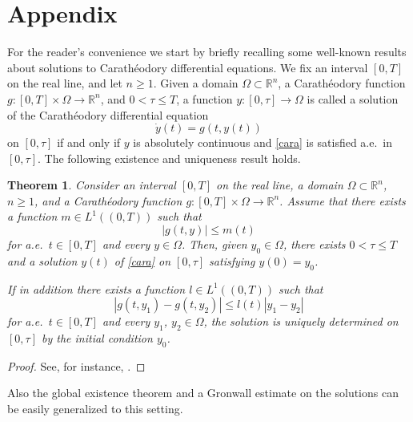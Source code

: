 \documentclass[11pt]{article}
\theoremstyle{plain}
\newtheorem{theorem}{Theorem}[section]
\theoremstyle{definition}
\theoremstyle{remark}
\numberwithin{equation}{section}
\newcommand{\R}{{\mathbb R}}
\newcommand{\Om}{\Omega}
\begin{document}
\section{Appendix}
For the reader's convenience we start by briefly recalling some well-known results about solutions to Carath{\'e}odory differential equations. We fix an interval $[0,T]$ on the real line, and let $n\ge 1$.
Given a domain $\Om \subset \R^n$, a Carath{\'e}odory function $g\colon[0,T]\times \Om \to \R^n$, and $0<\tau \le T$, a function $y\colon [0,\tau]\to \Om$ is called a solution of the Carath{\'e}odory differential equation
\begin{equation}\label{cara}
\dot y(t)=g(t, y(t))
\end{equation}
on $[0,\tau]$ if and only if $y$ is absolutely continuous and \eqref{cara} is satisfied a.e.\ in $[0,\tau]$.
The following existence and uniqueness result holds.
\begin{theorem}\label{cara2}
Consider an interval $[0,T]$ on the real line, a domain $\Om \subset \R^n$, $n\ge 1$, and a Carath{\'e}odory function $g\colon[0,T]\times \Om \to \R^n$. Assume that there exists a function $m \in L^1((0,T))$ such that
$$
|g(t,y)|\le m(t)
$$
for a.e.\ $t \in [0,T]$ and every $y \in \Om$. Then, given $y_0 \in \Om$, there exists $0<\tau \le T$ and a solution $y(t)$ of \eqref{cara} on $[0,\tau]$ satisfying $y(0)=y_0$. 

If in addition there exists a function $l \in L^1((0,T))$ such that
\begin{equation}\label{cara3}
|g(t,y_1)-g(t, y_2)|\le l(t)|y_1-y_2|
\end{equation}
for a.e.\ $t \in [0,T]$ and every $y_1$, $y_2 \in \Om$, the solution is uniquely determined on $[0,\tau]$ by the initial condition $y_0$.
\end{theorem}

\begin{proof}
See, for instance, \cite[Chapter 1, Theorems 1 and 2]{Fil}.
\end{proof}

Also the global existence theorem and a Gronwall estimate on the solutions can be easily generalized to this setting.
\end{document}
